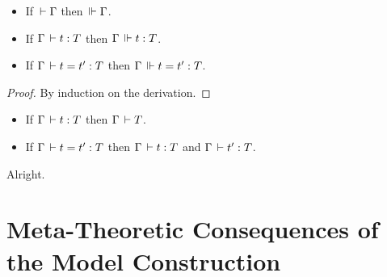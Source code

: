 \documentclass[a4paper,english]{lipics-utf8x}
\begin{document}
  \begin{theorem}
    \leavevmode
    \begin{itemize}
      \item If $\,\vdash \Gamma$ then $\,\Vdash \Gamma$.
      \item If $\Gamma \,\vdash t : T$ then $\Gamma \,\Vdash t : T$.
      \item If $\Gamma \,\vdash t = t' : T$ then $\Gamma \,\Vdash t = t' : T$.
    \end{itemize}
  \end{theorem}

  \begin{proof}
    By induction on the derivation.
  \end{proof}

  \begin{corollary}
    \leavevmode
    \begin{itemize}
      \item If $\Gamma \,\vdash t : T$ then $\Gamma \,\vdash T$.
      \item If $\Gamma \,\vdash t = t' : T$ then $\Gamma \,\vdash t : T$ and
      $\Gamma \,\vdash t' : T$.
    \end{itemize}
  \end{corollary}
  Alright.

  \section{Meta-Theoretic Consequences of the Model Construction}
\end{document}
